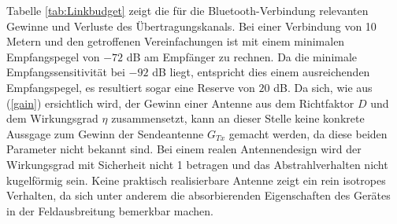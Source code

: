 Tabelle \ref{tab:Linkbudget} zeigt die für die Bluetooth-Verbindung relevanten Gewinne und Verluste des Übertragungskanals. Bei einer Verbindung von 10 Metern und den getroffenen Vereinfachungen ist mit einem minimalen Empfangspegel von $-72$ dB am Empfänger zu rechnen. Da die minimale Empfangssensitivität bei $-92$ dB liegt, entspricht dies einem ausreichenden Empfangspegel, es resultiert sogar eine Reserve von $20$ dB. Da sich, wie aus (\ref{gain}) ersichtlich wird, der Gewinn einer Antenne aus dem Richtfaktor $D$ und dem Wirkungsgrad $\eta$ zusammensetzt, kann an dieser Stelle keine konkrete Aussgage zum Gewinn der Sendeantenne $G_{Tx}$ gemacht werden, da diese beiden Parameter nicht bekannt sind. Bei einem realen Antennendesign wird der Wirkungsgrad mit Sicherheit nicht 1 betragen und das Abstrahlverhalten nicht kugelförmig sein. Keine praktisch realisierbare Antenne zeigt ein rein isotropes Verhalten, da sich unter anderem die absorbierenden Eigenschaften des  Gerätes in der Feldausbreitung bemerkbar machen. 


